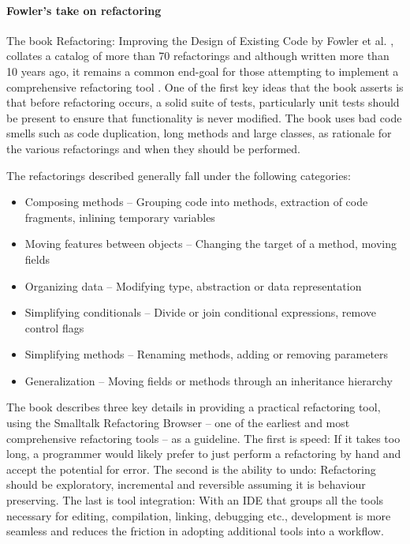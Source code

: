 \paragraph{Fowler's take on refactoring}
The book Refactoring: Improving the Design of Existing Code by Fowler et al. \cite{fowler99}, collates a catalog of more than 70 refactorings and although written more than 10 years ago, it remains a common end-goal for those attempting to implement a comprehensive refactoring tool \cite{jetbrains15}. One of the first key ideas that the book asserts is that before refactoring occurs, a solid suite of tests, particularly unit tests should be present to ensure that functionality is never modified. The book uses bad code smells such as code duplication, long methods and large classes, as rationale for the various refactorings and when they should be performed. 

The refactorings described generally fall under the following categories:
\begin{itemize}
\item Composing methods -- Grouping code into methods, extraction of code fragments, inlining temporary variables
\item Moving features between objects -- Changing the target of a method, moving fields
\item Organizing data -- Modifying type, abstraction or data representation
\item Simplifying conditionals -- Divide or join conditional expressions, remove control flags
\item Simplifying methods -- Renaming methods, adding or removing parameters
\item Generalization -- Moving fields or methods through an inheritance hierarchy
\end{itemize}

The book describes three key details in providing a practical refactoring tool, using the Smalltalk Refactoring Browser -- one of the earliest and most comprehensive refactoring tools -- as a guideline. The first is speed: If it takes too long, a programmer would likely prefer to just perform a refactoring by hand and accept the potential for error. The second is the ability to undo: Refactoring should be exploratory, incremental and reversible assuming it is behaviour preserving. The last is tool integration: With an IDE that groups all the tools necessary for editing, compilation, linking, debugging etc., development is more seamless and reduces the friction in adopting additional tools into a workflow. 

